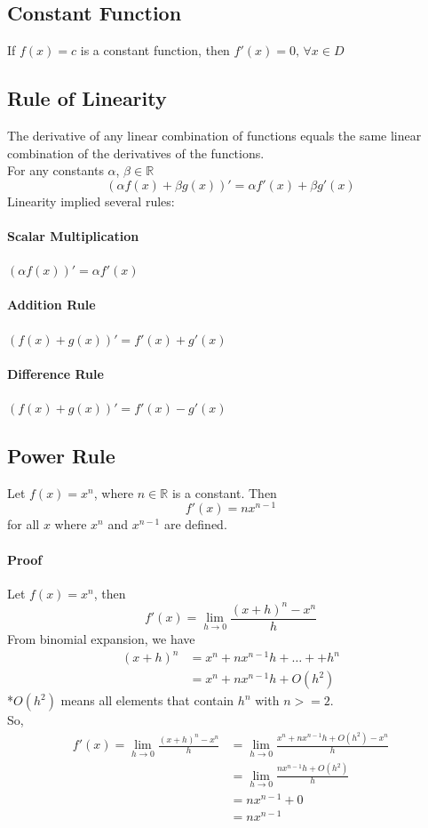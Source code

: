\documentclass[12pt]{article}
\begin{document}
\subsection{Constant Function}
If $f(x) = c$ is a constant function, then $f'(x) = 0 \textrm{,  } \forall x \in D$
\subsection{Rule of Linearity}
The derivative of any linear combination of functions equals the same linear combination of the derivatives of the functions. \\
For any constants $\alpha$, $\beta \in \mathbb{R}$
\[
    (\alpha f(x) + \beta g(x))' = \alpha f'(x) + \beta g'(x)
\]
Linearity implied several rules:
\paragraph{Scalar Multiplication} $(\alpha f(x))' = \alpha f'(x)$
\paragraph{Addition Rule} $(f(x) + g(x))' = f'(x) + g'(x)$
\paragraph{Difference Rule} $(f(x) + g(x))' = f'(x) - g'(x)$

\subsection{Power Rule}
Let $f(x) = x^n$, where $n \in \mathbb{R}$ is a constant. Then
\[
    f'(x) = n x^{n - 1}
\]
for all $x$ where $x^n$ and $x^{n-1}$ are defined.

\paragraph{Proof} Let $f(x) = x^n$, then
\[
    f'(x) = \lim_{h \to 0} \frac{(x + h)^n - x^n}{h} 
\]
From binomial expansion, we have
\begin{align*} 
    (x + h)^n &= x^n + nx^{n - 1}h + \dots + + h^n \\
    &= x^n + nx^{n - 1}h + O(h^2)
\end{align*}
*$O(h^2)$ means all elements that contain $h^n$ with $n >= 2$. \\
\noindent
So, 
\begin{align*} 
    f'(x) = \lim_{h \to 0} \frac{(x + h)^n - x^n}{h} &= \lim_{h \to 0} \frac{x^n + nx^{n - 1}h + O(h^2)- x^n}{h} \\
    &= \lim_{h \to 0} \frac{nx^{n - 1}h + O(h^2)}{h} \\
    &= nx^{n - 1} + 0 \\
    &= nx^{n - 1} 
\end{align*}
\end{document}
